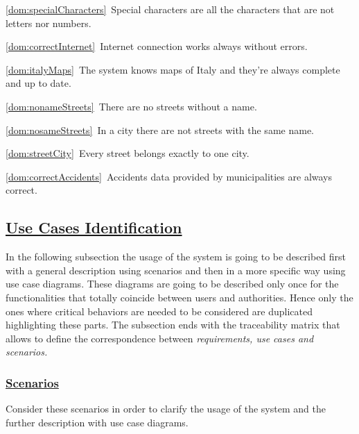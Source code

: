 \begin{description}
\begin{description}
					\item \ref{dom:specialCharacters}\ Special characters are all the characters that are not letters nor numbers.
					\item \ref{dom:correctInternet}\ Internet connection works always without errors.
					\item \ref{dom:italyMaps}\ The system knows maps of Italy and they’re always complete and up to date.
					\item \ref{dom:nonameStreets}\ There are no streets without a name.
					\item \ref{dom:nosameStreets}\ In a city there are not streets with the same name.
					\item \ref{dom:streetCity}\ Every street belongs exactly to one city.
					\item \ref{dom:correctAccidents}\ Accidents data provided by municipalities are always correct.	
				\end{description}		
		\end{description}

\subsection[Use Cases Identification]{\hyperlink{toc}{Use Cases Identification}}
	In the following subsection the usage of the system is going to be described first with a general description using scenarios and then in a more specific way using use case diagrams. These diagrams are going to be described only once for the functionalities that totally coincide between users and authorities. Hence only the ones where critical behaviors are needed to be considered are duplicated highlighting these parts. The subsection ends with the traceability matrix that allows to define the correspondence between \emph{requirements, use cases and scenarios.}
	
	\subsubsection[Scenarios]{\hyperlink{toc}{Scenarios}}
		Consider these scenarios in order to clarify the usage of the system and the further description with use case diagrams.
		
